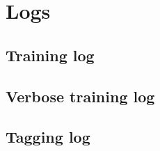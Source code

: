 \chapter{Logs}
\label{chp:traininglog}
\section{Training log}

\section{Verbose training log}
\section{Tagging log}